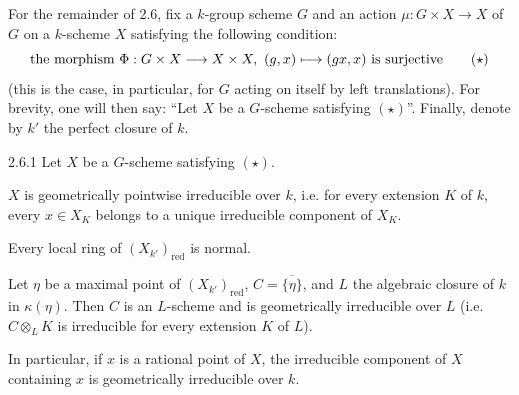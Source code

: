 For the remainder of 2.6, fix a $k$-group scheme $G$ and an action $\mu:G\times X\to X$ of $G$ on a $k$-scheme $X$ satisfying the following condition:
\[
\text{the morphism }\Phi:G\times X\to X\times X,\ (g,x)\mto(gx,x)\text{ is surjective}\tag{$\star$}
\]
(this is the case, in particular, for $G$ acting on itself by left translations). For brevity, one will then say: ``Let $X$ be a $G$-scheme satisfying $(\star)$''. Finally, denote by $k'$ the perfect closure of $k$.
\begin{proposition}{2.6.1}\label{VIA.2.6.1}
Let $X$ be a $G$-scheme satisfying $(\star)$.
\begin{enumeratei}
\item $X$ is geometrically pointwise irreducible over $k$, i.e. for every extension $K$ of $k$, every $x\in X_K$ belongs to a unique irreducible component of $X_K$.
\item Every local ring of $(X_{k'})_{\mathrm{red}}$ is normal.
\item Let $\eta$ be a maximal point of $(X_{k'})_{\mathrm{red}}$, $C=\overline{\{\eta\}}$, and $L$ the algebraic closure of $k$ in $\kappa(\eta)$. Then $C$ is an $L$-scheme and is geometrically irreducible over $L$ (i.e. $C\otimes_LK$ is irreducible for every extension $K$ of $L$).
\item In particular, if $x$ is a rational point of $X$, the irreducible component of $X$ containing $x$ is geometrically irreducible over $k$.
\end{enumeratei}
\end{proposition}
